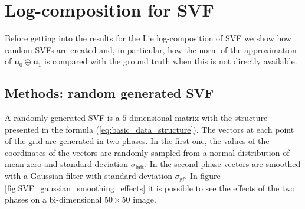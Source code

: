 \section{Log-composition for SVF}
Before getting into the results for the Lie log-composition of SVF we show how random SVFs are created and, in particular, how the norm of the approximation of $\mathbf{u}_0\oplus \mathbf{u}_1$ is compared with the ground truth when this is not directly available.

\subsection{Methods: random generated SVF}
A randomly generated SVF is a $5$-dimensional matrix with the structure presented in the formula (\ref{eq:basic_data_structure}). 
The vectors at each point of the grid are generated in two phases. 
In the first one, the values of the coordinates of the vectors are randomly sampled from a normal distribution of mean zero and standard deviation $\sigma_{\text{init}}$. 
In the second phase vectors are smoothed with a Gaussian filter with standard deviation $\sigma_{\text{gf}}$. In figure \ref{fig:SVF_gaussian_smoothing_effects} it is possible to see the effects of the two phases on a bi-dimensional $50\times 50$ image.


